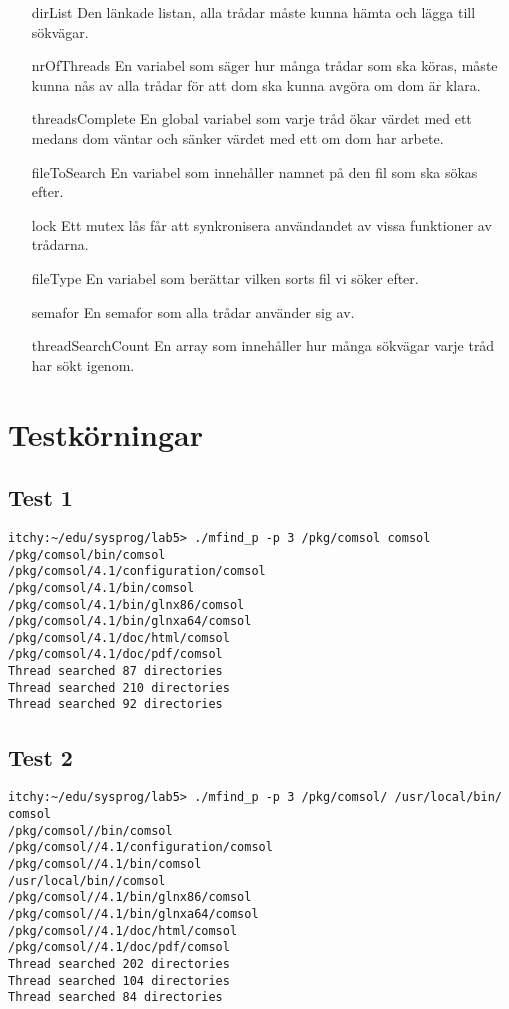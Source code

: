 \documentclass[11pt, titlepage, oneside, a4paper]{article}
\newcommand{\Section}[1]{\section{#1}\vspace{-8pt}}
\begin{document}
		    \begin{itemize}
		     \item[dirList] Den länkade listan, alla trådar måste kunna hämta och lägga till sökvägar.
		     \item[nrOfThreads] En variabel som säger hur många trådar som ska köras, måste kunna nås av alla trådar för att dom ska kunna avgöra om dom är klara.
		     \item[threadsComplete] En global variabel som varje tråd ökar värdet med ett medans dom väntar och sänker värdet med ett om dom har arbete.
		     \item[fileToSearch] En variabel som innehåller namnet på den fil som ska sökas efter.
		     \item[lock] Ett mutex lås får att synkronisera användandet av vissa funktioner av trådarna.
		     \item[fileType] En variabel som berättar vilken sorts fil vi söker efter.
		     \item[semafor] En semafor som alla trådar använder sig av.
		     \item[threadSearchCount] En array som innehåller hur många sökvägar varje tråd har sökt igenom.
		    \end{itemize}

		\Section{Testkörningar}
		
		\subsection{Test 1}
		\begin{verbatim} 
itchy:~/edu/sysprog/lab5> ./mfind_p -p 3 /pkg/comsol comsol
/pkg/comsol/bin/comsol
/pkg/comsol/4.1/configuration/comsol
/pkg/comsol/4.1/bin/comsol
/pkg/comsol/4.1/bin/glnx86/comsol
/pkg/comsol/4.1/bin/glnxa64/comsol
/pkg/comsol/4.1/doc/html/comsol
/pkg/comsol/4.1/doc/pdf/comsol
Thread searched 87 directories
Thread searched 210 directories
Thread searched 92 directories
		 \end{verbatim}

		\subsection{Test 2}
		\begin{verbatim} 
itchy:~/edu/sysprog/lab5> ./mfind_p -p 3 /pkg/comsol/ /usr/local/bin/ comsol
/pkg/comsol//bin/comsol
/pkg/comsol//4.1/configuration/comsol
/pkg/comsol//4.1/bin/comsol
/usr/local/bin//comsol
/pkg/comsol//4.1/bin/glnx86/comsol
/pkg/comsol//4.1/bin/glnxa64/comsol
/pkg/comsol//4.1/doc/html/comsol
/pkg/comsol//4.1/doc/pdf/comsol
Thread searched 202 directories
Thread searched 104 directories
Thread searched 84 directories
		 \end{verbatim}
		 
\end{document}
